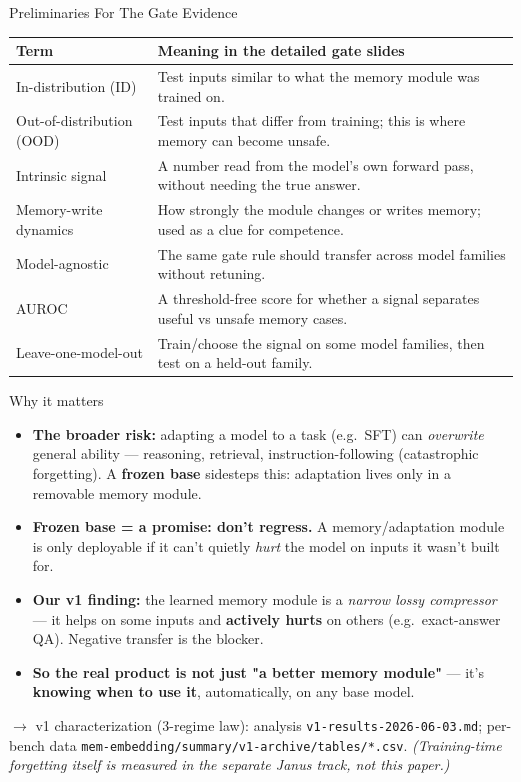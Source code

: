 \begin{frame}{Preliminaries For The Gate Evidence}
  \scriptsize
  \begin{tabular}{p{}p{}}
    \toprule
    Term & Meaning in the detailed gate slides \\
    \midrule
    In-distribution (ID) & Test inputs similar to what the memory module was trained on. \\
    Out-of-distribution (OOD) & Test inputs that differ from training; this is where memory can become unsafe. \\
    Intrinsic signal & A number read from the model's own forward pass, without needing the true answer. \\
    Memory-write dynamics & How strongly the module changes or writes memory; used as a clue for competence. \\
    Model-agnostic & The same gate rule should transfer across model families without retuning. \\
    AUROC & A threshold-free score for whether a signal separates useful vs unsafe memory cases. \\
    Leave-one-model-out & Train/choose the signal on some model families, then test on a held-out family. \\
    \bottomrule
  \end{tabular}
\end{frame}

\begin{frame}{Why it matters}
  \begin{itemize}
    \item \textbf{The broader risk:} adapting a model to a task (e.g.\ SFT) can \emph{overwrite} general ability --- reasoning, retrieval, instruction-following (catastrophic forgetting). A \textbf{frozen base} sidesteps this: adaptation lives only in a removable memory module.
    \item \textbf{Frozen base = a promise: don't regress.} A memory/adaptation module is only deployable if it can't quietly \emph{hurt} the model on inputs it wasn't built for.
    \item \textbf{Our v1 finding:} the learned memory module is a \emph{narrow lossy compressor} --- it helps on some inputs and \textbf{actively hurts} on others (e.g.\ exact-answer QA). Negative transfer is the blocker.
    \item \textbf{So the real product is not just "a better memory module"} --- it's \textbf{knowing when to use it}, automatically, on any base model.
  \end{itemize}
  \vspace{0.6em}
  \footnotesize $\rightarrow$ v1 characterization (3-regime law): analysis \texttt{v1-results-2026-06-03.md}; per-bench data \texttt{mem-embedding/summary/v1-archive/tables/*.csv}. \emph{(Training-time forgetting itself is measured in the separate Janus track, not this paper.)}
\end{frame}


